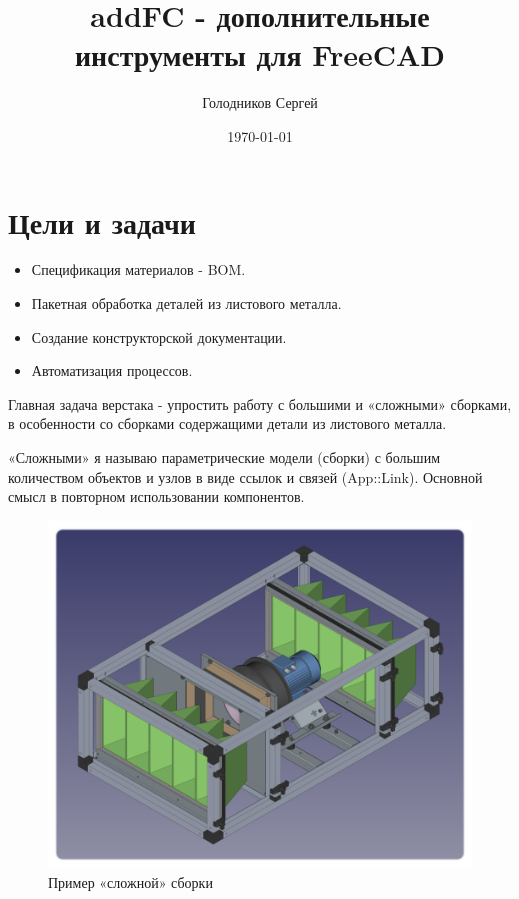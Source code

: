 \documentclass[a4paper,12pt]{article}
\title{addFC - дополнительные инструменты для FreeCAD}
\author{Голодников Сергей}
\date{\today}
\begin{document}
\maketitle


\section{Цели и задачи}
\begin{itemize}
	\item Спецификация материалов - BOM.
	\item Пакетная обработка деталей из листового металла.
	\item Создание конструкторской документации.
	\item Автоматизация процессов.\\
\end{itemize}

Главная задача верстака - упростить работу с большими и «сложными» сборками, в особенности со сборками содержащими детали из листового металла.

«Сложными» я называю параметрические модели (сборки) с большим количеством объектов и узлов в виде ссылок и связей (App::Link). Основной смысл в повторном использовании компонентов.

\begin{figure}[htp]
\centering
\includegraphics[scale=12.00]{img/assembly_example.png}
\caption{Пример «сложной» сборки}
\label{sec:assembly_example}
\end{figure}
\end{document}
